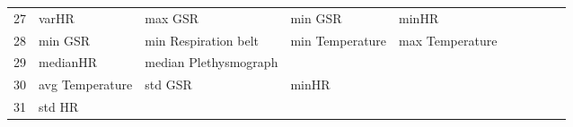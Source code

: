 \begin{landscape}
\begin{table}[]
\begin{tabular}{l|llllllll}
27       & varHR                   & max GSR               & min GSR                 & minHR                   &                         &                       &                      &          &                      &        \\
28       & min GSR                 & min Respiration belt  & min Temperature         & max Temperature         &                         &                       &                      &          &                      &        \\
29       & medianHR                & median Plethysmograph &                         &                         &                         &                       &                      &          &                      &        \\
30       & avg Temperature         & std GSR               & minHR                   &                         &                         &                       &                      &          &                      &        \\
31       & std HR                  &                       &                         &                         &                         &                       &                      &          &                      &        \\
\end{tabular}
\end{table}
\end{landscape}
\clearpage
